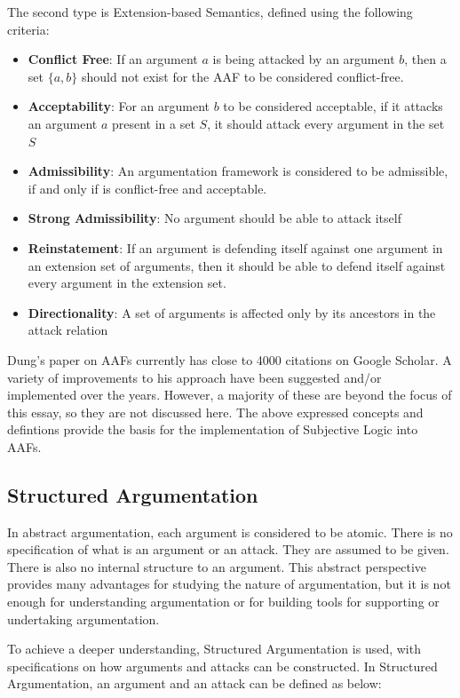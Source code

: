 \documentclass[sigconf]{acmart}
\begin{document}
The second type is Extension-based Semantics, defined using the following criteria:
\begin{itemize}
  \item \textbf{Conflict Free}: If an argument $a$ is being attacked by an argument $b$, then a set $\{a, b\}$ should not exist for the AAF to be considered conflict-free.
  \item \textbf{Acceptability}: For an argument $b$ to be considered acceptable, if it attacks an argument $a$ present in a set $S$, it should attack every argument in the set $S$
  \item \textbf{Admissibility}: An argumentation framework is considered to be admissible, if and only if is conflict-free and acceptable.
  \item \textbf{Strong Admissibility}: No argument should be able to attack itself
  \item \textbf{Reinstatement}: If an argument is defending itself against one argument in an extension set of arguments, then it should be able to defend itself against every argument in the extension set.
  \item \textbf{Directionality}: A set of arguments is affected only by its ancestors in the attack relation 
\end{itemize}

Dung's paper on AAFs currently has close to 4000 citations on Google Scholar. A variety of improvements to his approach have been suggested and/or implemented over the years. However, a majority of these are beyond the focus of this essay, so they are not discussed here. The above expressed concepts and defintions provide the basis for the implementation of Subjective Logic into AAFs.

\subsection{Structured Argumentation}
In abstract argumentation, each argument is considered to be atomic. There is no specification of what is an argument or an attack. They are assumed to be given. There is also no internal structure
to an argument. This abstract perspective provides many advantages for studying the nature
of argumentation, but it is not enough for understanding argumentation or for
building tools for supporting or undertaking argumentation.

To achieve a deeper understanding, Structured Argumentation is used, with specifications on how arguments and attacks can be constructed. In Structured Argumentation, an argument and an attack can be defined as below:
\end{document}
